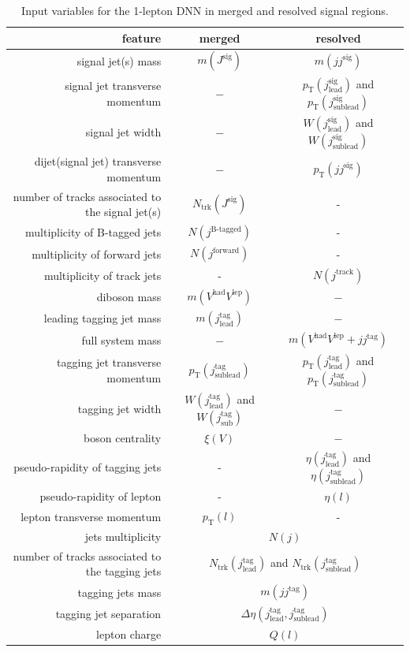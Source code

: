 \begin{table}[ht]
    \centering
    \begin{tabular}{r|c|c}
     feature & merged & resolved\\
     \hline
     \hline
     signal jet(s) mass & $m(J^\text{sig})$ & $m(jj^\text{sig})$\\
     signal jet transverse momentum & $ - $ & $p_\text{T}(j^\text{sig}_\text{lead})$ and  $p_\text{T}(j^\text{sig}_\text{sublead})$\\
     signal jet width & $ - $ & $W(j^\text{sig}_\text{lead})$ and  $W(j^\text{sig}_\text{sublead})$\\
     dijet(signal jet) transverse momentum & $ - $ & $p_\text{T}(jj^\text{sig})$\\
     number of tracks associated to the signal jet(s) & $N_\text{trk}(J^\text{sig})$ & -\\
     multiplicity of B-tagged jets & $N(j^\text{B-tagged})$ & -\\
     multiplicity of forward jets & $N(j^\text{forward})$ & -\\
     multiplicity of track jets & - & $N(j^\text{track})$\\
     diboson mass & $m(V^\text{had}V^\text{lep})$ & $ - $\\
     leading tagging jet mass & $m(j^\text{tag}_\text{lead})$ & $ - $\\
     full system mass & $ - $ & $m(V^\text{had}V^\text{lep}+jj^\text{tag})$\\
     tagging jet transverse momentum & $p_\text{T}(j^\text{tag}_\text{sublead})$ & $p_\text{T}(j^\text{tag}_\text{lead})$ and $p_\text{T}(j^\text{tag}_\text{sublead})$\\
     tagging jet width & $W(j^\text{tag}_\text{lead})$ and $W(j^\text{tag}_\text{sub})$  & $ - $\\
     boson centrality & $\xi(V)$ & $ - $\\
     pseudo-rapidity of tagging jets & - & $\eta(j^\text{tag}_\text{lead})$ and $ \eta(j^\text{tag}_\text{sublead})$\\
     pseudo-rapidity of lepton & - & $\eta(l)$\\
     lepton transverse momentum & $p_\text{T}(l)$ & -\\
     jets multiplicity & \multicolumn{2}{c}{$N(j)$}\\
     number of tracks associated to the tagging jets & \multicolumn{2}{c}{$N_\text{trk}(j^\text{tag}_\text{lead})$ and $N_\text{trk}(j^\text{tag}_\text{sublead})$}\\
     tagging jets mass & \multicolumn{2}{c}{$m(jj^\text{tag})$}\\
     tagging jet separation & \multicolumn{2}{c}{$\Delta\eta(j^\text{tag}_\text{lead},j^\text{tag}_\text{sublead})$}\\
     lepton charge & \multicolumn{2}{c}{$Q(l)$}\\
    \end{tabular}
    \caption{Input variables for the 1-lepton DNN in merged and resolved signal regions.}
    \label{tab:1lepNN}
\end{table}

